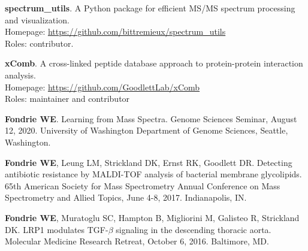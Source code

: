 \documentclass{article}
\newcommand{\mysection}[1]{\vspace{1ex {\bf \large \textrm{#1}} \quad
    \hrulefill}}
\newcommand{\myref}[1]{\href{#1}{\url{#1}}}
\begin{document}
\begin{etaremune}
 \item {\bf spectrum\_utils}. A Python package for efficient MS/MS spectrum
   processing and visualization. \\
   Homepage: \myref{https://github.com/bittremieux/spectrum_utils} \\
   Roles: contributor.

 \item {\bf xComb}. A cross-linked peptide database approach to protein-protein
   interaction analysis. \\
   Homepage: \myref{https://github.com/GoodlettLab/xComb} \\
   Roles: maintainer and contributor

\end{etaremune}

\mysection{Talks}
\begin{etaremune}
  \item {\bf Fondrie WE}. Learning from Mass Spectra. Genome Sciences
    Seminar, August 12, 2020. University of Washington Department of Genome
    Sciences, Seattle, Washington.
  
  \item {\bf Fondrie WE}, Leung LM, Strickland DK, Ernst RK, Goodlett DR.
    Detecting antibiotic resistance by MALDI-TOF analysis of bacterial membrane
    glycolipids. 65th American Society for Mass Spectrometry Annual Conference
    on Mass Spectrometry and Allied Topics, June 4-8, 2017. Indianapolis, IN.
    
  \item {\bf Fondrie WE}, Muratoglu SC, Hampton B, Migliorini M, Galisteo R,
    Strickland DK. LRP1 modulates TGF-$\beta$ signaling in the descending
    thoracic aorta. Molecular Medicine Research Retreat, October 6, 2016.
    Baltimore, MD.
\end{etaremune}
\end{document}

